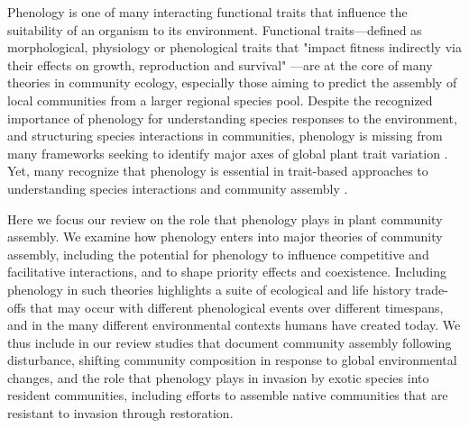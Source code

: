 \documentclass[11pt]{article}
\begin{document}
Phenology is one of many interacting functional traits that influence the suitability of an organism to its environment. Functional traits---defined as morphological, physiology or phenological traits that "impact fitness indirectly via their effects on growth, reproduction and survival" \citep{violle2007let}---are at the core of many theories in community ecology, especially those aiming to predict the assembly of local communities from a larger regional species pool. Despite the recognized importance of phenology for understanding species responses to the environment, and structuring species interactions in communities, phenology is missing from many frameworks seeking to identify major axes of global plant trait variation \citep[e.g.][]{westoby1998leaf,wright2004worldwide,diaz2016global,joswig2022climatic}. Yet, many recognize that phenology is essential in trait-based approaches to understanding species interactions and community assembly \citep{cope2022role}.

Here we focus our review on the role that phenology plays in plant community assembly. We examine how phenology enters into major theories of community assembly, including the potential for phenology to influence competitive and facilitative interactions, and to shape priority effects and coexistence. Including phenology in such theories highlights a suite of ecological and life history trade-offs that may occur with different phenological events over different timespans, and in the many different environmental contexts humans have created today. We thus include in our review studies that document community assembly following disturbance, shifting community composition in response to global environmental changes, and the role that phenology plays in invasion by exotic species into resident communities, including efforts to assemble native communities that are resistant to invasion through restoration. 
\end{document}
